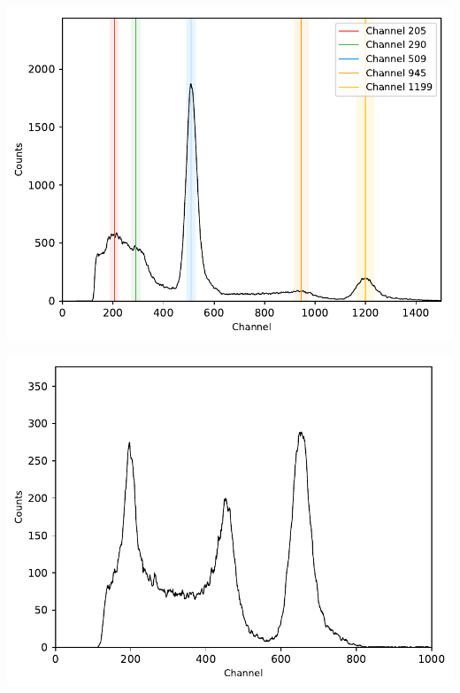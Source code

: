 \begin{multicols}{2}
\begin{center}
\begin{adjustbox}{max width=\linewidth, keepaspectratio}
        \end{adjustbox}
        \captionsetup{width=0.75\linewidth}
        \label{fig:Spectrum137Cs}
    \end{center}
\endminipage
%
\par
%
\minipage{\linewidth}
    \begin{center}
        \captionsetup{type=figure}
        \begin{adjustbox}{max width=\linewidth, keepaspectratio}
            \includegraphics[]{pdf/22Na}
        \end{adjustbox}
        \captionsetup{width=0.75\linewidth}
        \label{fig:Spectrum22Na}
    \end{center}
\endminipage
%
\par
%
\minipage{\linewidth}
    \begin{center}
        \captionsetup{type=figure}
        \begin{adjustbox}{max width=\linewidth, keepaspectratio}
            \includegraphics[]{pdf/137Cskoinz1}

\end{adjustbox}
\end{center}
\end{multicols}
